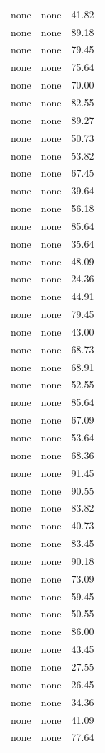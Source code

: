 \begin{tabular}{rrr}
none & none & 41.82 \\
none & none & 89.18 \\
none & none & 79.45 \\
none & none & 75.64 \\
none & none & 70.00 \\
none & none & 82.55 \\
none & none & 89.27 \\
none & none & 50.73 \\
none & none & 53.82 \\
none & none & 67.45 \\
none & none & 39.64 \\
none & none & 56.18 \\
none & none & 85.64 \\
none & none & 35.64 \\
none & none & 48.09 \\
none & none & 24.36 \\
none & none & 44.91 \\
none & none & 79.45 \\
none & none & 43.00 \\
none & none & 68.73 \\
none & none & 68.91 \\
none & none & 52.55 \\
none & none & 85.64 \\
none & none & 67.09 \\
none & none & 53.64 \\
none & none & 68.36 \\
none & none & 91.45 \\
none & none & 90.55 \\
none & none & 83.82 \\
none & none & 40.73 \\
none & none & 83.45 \\
none & none & 90.18 \\
none & none & 73.09 \\
none & none & 59.45 \\
none & none & 50.55 \\
none & none & 86.00 \\
none & none & 43.45 \\
none & none & 27.55 \\
none & none & 26.45 \\
none & none & 34.36 \\
none & none & 41.09 \\
none & none & 77.64 \\

\end{tabular}
